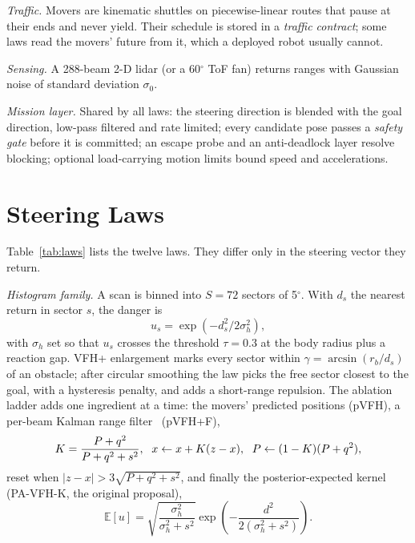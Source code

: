 \documentclass[journal]{IEEEtran}
\begin{document}
\textit{Traffic.} Movers are kinematic shuttles on piecewise-linear routes
that pause at their ends and never yield. Their schedule is stored in a
\emph{traffic contract}; some laws read the movers' future from it, which a
deployed robot usually cannot.

\textit{Sensing.} A 288-beam 2-D lidar (or a 60$^\circ$ ToF fan) returns
ranges with Gaussian noise of standard deviation $\sigma_0$.

\textit{Mission layer.} Shared by all laws: the steering direction is blended
with the goal direction, low-pass filtered and rate limited; every candidate
pose passes a \emph{safety gate} before it is committed; an escape probe and an
anti-deadlock layer resolve blocking; optional load-carrying motion limits bound
speed and accelerations.

\section{Steering Laws}
Table~\ref{tab:laws} lists the twelve laws. They differ only in the steering
vector they return.

\begin{table}[t]
\centering
\caption{Steering laws, the mover information they use, and compute per
control step (E15, mean over 800 runs).}
\label{tab:laws}
\end{table}

\textit{Histogram family.} A scan is binned into $S=72$ sectors of 5$^\circ$.
With $d_s$ the nearest return in sector $s$, the danger is
\begin{equation}
u_s=\exp\!\left(-d_s^2/2\sigma_h^2\right),
\end{equation}
with $\sigma_h$ set so that $u_s$ crosses the threshold $\tau=0.3$ at the body
radius plus a reaction gap. VFH+ enlargement marks every sector within
$\gamma=\arcsin(r_b/d_s)$ of an obstacle; after circular smoothing the law picks
the free sector closest to the goal, with a hysteresis penalty, and adds a
short-range repulsion. The ablation ladder adds one ingredient at a time: the
movers' predicted positions (pVFH), a per-beam Kalman range
filter~\cite{kalman1960} (pVFH+F),
\begin{equation}\small
K=\frac{P+q^2}{P+q^2+s^2},\ \ x\leftarrow x+K(z-x),\ \ P\leftarrow(1-K)(P+q^2),
\end{equation}
reset when $|z-x|>3\sqrt{P+q^2+s^2}$, and finally the posterior-expected
kernel (PA-VFH-K, the original proposal),
\begin{equation}
\mathbb{E}[u]=\sqrt{\frac{\sigma_h^2}{\sigma_h^2+s^2}}\exp\!\left(-\frac{d^2}{2(\sigma_h^2+s^2)}\right).
\end{equation}
\end{document}
